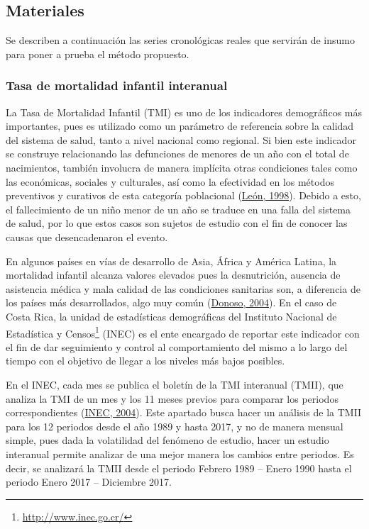 \documentclass[
]{article}
\begin{document}
\subsection{Materiales}

Se describen a continuación las series cronológicas reales que servirán
de insumo para poner a prueba el método propuesto.

\subsubsection{Tasa de mortalidad infantil interanual}

La Tasa de Mortalidad Infantil (TMI) es uno de los indicadores
demográficos más importantes, pues es utilizado como un parámetro de
referencia sobre la calidad del sistema de salud, tanto a nivel nacional
como regional. Si bien este indicador se construye relacionando las
defunciones de menores de un año con el total de nacimientos, también
involucra de manera implícita otras condiciones tales como las
económicas, sociales y culturales, así como la efectividad en los
métodos preventivos y curativos de esta categoría poblacional
(\protect\hyperlink{ref-leon}{León, 1998}). Debido a esto, el
fallecimiento de un niño menor de un año se traduce en una falla del
sistema de salud, por lo que estos casos son sujetos de estudio con el
fin de conocer las causas que desencadenaron el evento.

En algunos países en vías de desarrollo de Asia, África y América
Latina, la mortalidad infantil alcanza valores elevados pues la
desnutrición, ausencia de asistencia médica y mala calidad de las
condiciones sanitarias son, a diferencia de los países más
desarrollados, algo muy común (\protect\hyperlink{ref-donoso}{Donoso,
2004}). En el caso de Costa Rica, la unidad de estadísticas demográficas
del Instituto Nacional de Estadística y Censos\footnote{\url{http://www.inec.go.cr/}}
(INEC) es el ente encargado de reportar este indicador con el fin de dar
seguimiento y control al comportamiento del mismo a lo largo del tiempo
con el objetivo de llegar a los niveles más bajos posibles.

En el INEC, cada mes se publica el boletín de la TMI interanual (TMII),
que analiza la TMI de un mes y los 11 meses previos para comparar los
periodos correspondientes (\protect\hyperlink{ref-infantiles}{INEC,
2004}). Este apartado busca hacer un análisis de la TMII para los 12
periodos desde el año 1989 y hasta 2017, y no de manera mensual simple,
pues dada la volatilidad del fenómeno de estudio, hacer un estudio
interanual permite analizar de una mejor manera los cambios entre
periodos. Es decir, se analizará la TMII desde el periodo Febrero 1989
-- Enero 1990 hasta el periodo Enero 2017 -- Diciembre 2017.
\end{document}
